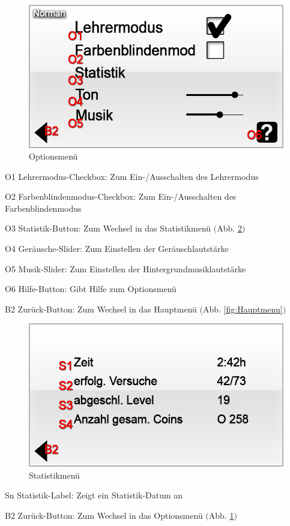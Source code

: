 \begin{figure}[H]
\centering
\includegraphics[scale=0.55]{../gui/_jpeg_numeration/settings.jpg}
\caption{Optionsmenü}
\label{fig:Optionsmenu}
\end{figure}
\begin{description*}
\item[O1] Lehrermodus-Checkbox: Zum Ein-/Ausschalten des Lehrermodus
\item[O2] Farbenblindenmodus-Checkbox: Zum Ein-/Ausschalten des Farbenblindenmodus
\item[O3] Statistik-Button: Zum Wechsel in das Statistikmenü $($Abb. \ref{fig:Statistikmenu}$)$
\item[O4] Geräusche-Slider: Zum Einstellen der Geräuschlautstärke
\item[O5] Musik-Slider: Zum Einstellen der Hintergrundmusiklautstärke
\item[O6] Hilfe-Button: Gibt Hilfe zum Optionsmenü
\item[B2] Zurück-Button: Zum Wechsel in das Hauptmenü $($Abb. \ref{fig:Hauptmenu}$)$
\end{description*}


\begin{figure}[H]
\centering
\includegraphics[scale=0.55]{../gui/_jpeg_numeration/stat.jpg}
\caption{Statistikmenü}
\label{fig:Statistikmenu}
\end{figure}
\begin{description*}
\item[Sn] Statistik-Label: Zeigt ein Statistik-Datum an
\item[B2] Zurück-Button: Zum Wechsel in das Optionsmenü $($Abb. \ref{fig:Optionsmenu}$)$
\end{description*}

